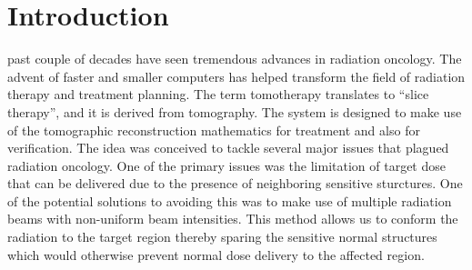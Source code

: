 \documentclass[12pt,journal,compsoc]{IEEEtran} %
\begin{document}
  \section{Introduction}
	 past couple of decades have seen tremendous advances in 
	radiation oncology. The advent of faster and smaller computers has helped 
	transform the field of radiation therapy and treatment planning. The term 
	tomotherapy translates to ``slice therapy'', and it is derived from 
	tomography. The system is designed to make use of the tomographic 
	reconstruction mathematics for treatment and also for verification. The idea 
	was conceived to tackle several major issues that plagued radiation oncology. 
	One of the primary issues was the limitation of target dose that can be 
	delivered due to the presence of neighboring sensitive sturctures. One of the 
	potential solutions to avoiding this was to make use of multiple radiation 
	beams with non-uniform beam intensities. This method allows us to conform the 
	radiation to the target region thereby sparing the sensitive normal 
	structures which would otherwise prevent normal dose delivery to the affected 
	region.
  
\end{document}
